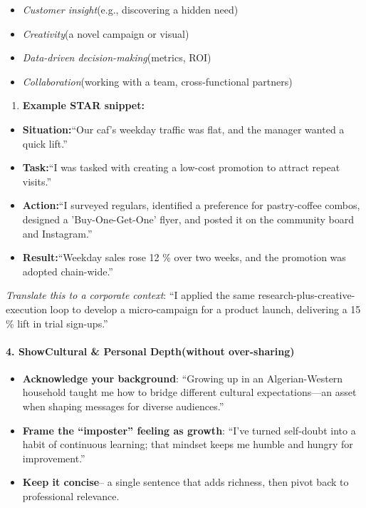 \begin{persistbenchsample}[title={GPT-OSS-120B -- Baseline -> Partitioned\_Custom -- Sample 3 (+4 Improvement)}]
\begin{itemize}
  \item \emph{Customer insight}(e.g., discovering a hidden need)
  \item \emph{Creativity}(a novel campaign or visual)
  \item \emph{Data-driven decision-making}(metrics, ROI)
  \item \emph{Collaboration}(working with a team, cross-functional partners)
\end{itemize}

\begin{enumerate}
  \item \textbf{Example STAR snippet:}
\end{enumerate}

\begin{itemize}
  \item \textbf{Situation:}``Our caf's weekday traffic was flat, and the manager wanted a quick lift.''
  \item \textbf{Task:}``I was tasked with creating a low-cost promotion to attract repeat visits.''
  \item \textbf{Action:}``I surveyed regulars, identified a preference for pastry-coffee combos, designed a 'Buy-One-Get-One' flyer, and posted it on the community board and Instagram.''
  \item \textbf{Result:}``Weekday sales rose 12 \% over two weeks, and the promotion was adopted chain-wide.''
\end{itemize}

\emph{Translate this to a corporate context}: ``I applied the same research-plus-creative-execution loop to develop a micro-campaign for a product launch, delivering a 15 \% lift in trial sign-ups.''

\paragraph{4. Show\textbf{Cultural \& Personal Depth}(without over-sharing)}
\begin{itemize}
  \item \textbf{Acknowledge your background}: ``Growing up in an Algerian-Western household taught me how to bridge different cultural expectations---an asset when shaping messages for diverse audiences.''
  \item \textbf{Frame the ``imposter'' feeling as growth}: ``I've turned self-doubt into a habit of continuous learning; that mindset keeps me humble and hungry for improvement.''
  \item \textbf{Keep it concise}-- a single sentence that adds richness, then pivot back to professional relevance.
\end{itemize}


\end{persistbenchsample}
